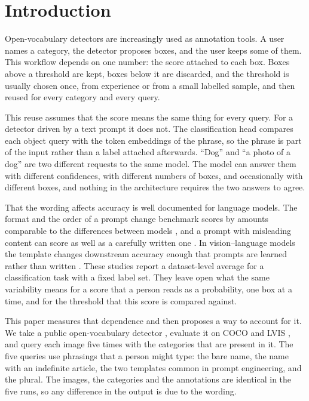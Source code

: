 \section{Introduction}\label{sec:intro}

Open-vocabulary detectors are increasingly used as annotation tools. A user names a
category, the detector proposes boxes, and the user keeps some of them. This workflow depends
on one number: the score attached to each box. Boxes above a threshold are kept, boxes below
it are discarded, and the threshold is usually chosen once, from experience or from a small
labelled sample, and then reused for every category and every query.

This reuse assumes that the score means the same thing for every query. For a detector driven
by a text prompt it does not. The classification head compares each object query with the
token embeddings of the phrase, so the phrase is part of the input rather than a label
attached afterwards. ``Dog'' and ``a photo of a dog'' are two different requests to the same
model. The model can answer them with different confidences, with different numbers of boxes,
and occasionally with different boxes, and nothing in the architecture requires the two
answers to agree.

That the wording affects accuracy is well documented for language models. The format and the
order of a prompt change benchmark scores by amounts comparable to the differences between
models \citep{sclar2024quantifying,lu2022fantastically}, and a prompt with misleading content
can score as well as a carefully written one \citep{webson2022prompts}. In vision--language
models the template changes downstream accuracy enough that prompts are learned rather than
written \citep{zhou2022learning}. These studies report a dataset-level average for a
classification task with a fixed label set. They leave open what the same variability means
for a score that a person reads as a probability, one box at a time, and for the threshold
that this score is compared against.

This paper measures that dependence and then proposes a way to account for it. We take a
public open-vocabulary detector \citep{liu2024grounding}, evaluate it on COCO
\citep{lin2014microsoft} and LVIS \citep{gupta2019lvis}, and query each image five times with
the categories that are present in it. The five queries use phrasings that a person might type: the bare name, the name with
an indefinite article, the two templates common in prompt engineering, and the plural. The
images, the categories and the annotations are identical in the five runs, so any difference
in the output is due to the wording.

